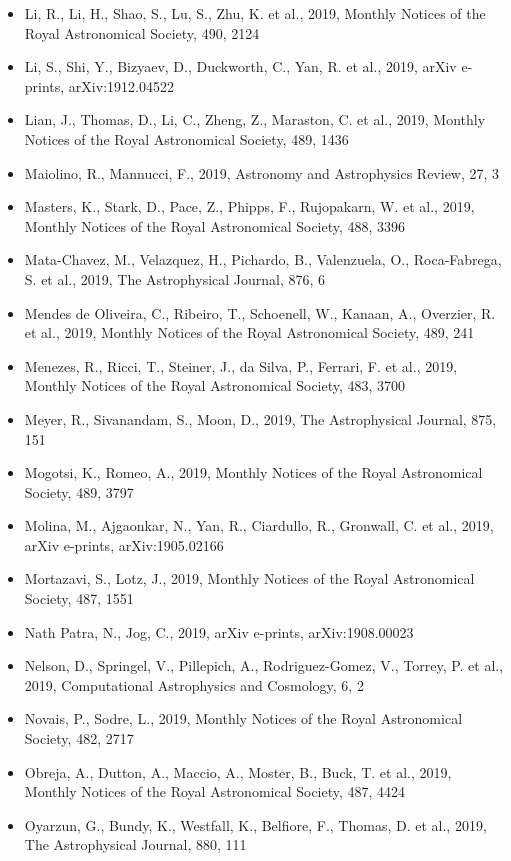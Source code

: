 \documentclass{letter}
\begin{document}
\begin{enumerate}
\begin{itemize}
\item Li, R., Li, H., Shao, S., Lu, S., Zhu, K. et al., 2019, Monthly Notices of the Royal Astronomical Society, 490, 2124
\item Li, S., Shi, Y., Bizyaev, D., Duckworth, C., Yan, R. et al., 2019, arXiv e-prints, arXiv:1912.04522
\item Lian, J., Thomas, D., Li, C., Zheng, Z., Maraston, C. et al., 2019, Monthly Notices of the Royal Astronomical Society, 489, 1436
\item Maiolino, R., Mannucci, F., 2019, Astronomy and Astrophysics Review, 27, 3
\item Masters, K., Stark, D., Pace, Z., Phipps, F., Rujopakarn, W. et al., 2019, Monthly Notices of the Royal Astronomical Society, 488, 3396
\item Mata-Chavez, M., Velazquez, H., Pichardo, B., Valenzuela, O., Roca-Fabrega, S. et al., 2019, The Astrophysical Journal, 876, 6
\item Mendes de Oliveira, C., Ribeiro, T., Schoenell, W., Kanaan, A., Overzier, R. et al., 2019, Monthly Notices of the Royal Astronomical Society, 489, 241
\item Menezes, R., Ricci, T., Steiner, J., da Silva, P., Ferrari, F. et al., 2019, Monthly Notices of the Royal Astronomical Society, 483, 3700
\item Meyer, R., Sivanandam, S., Moon, D., 2019, The Astrophysical Journal, 875, 151
\item Mogotsi, K., Romeo, A., 2019, Monthly Notices of the Royal Astronomical Society, 489, 3797
\item Molina, M., Ajgaonkar, N., Yan, R., Ciardullo, R., Gronwall, C. et al., 2019, arXiv e-prints, arXiv:1905.02166
\item Mortazavi, S., Lotz, J., 2019, Monthly Notices of the Royal Astronomical Society, 487, 1551
\item Nath Patra, N., Jog, C., 2019, arXiv e-prints, arXiv:1908.00023
\item Nelson, D., Springel, V., Pillepich, A., Rodriguez-Gomez, V., Torrey, P. et al., 2019, Computational Astrophysics and Cosmology, 6, 2
\item Novais, P., Sodre, L., 2019, Monthly Notices of the Royal Astronomical Society, 482, 2717
\item Obreja, A., Dutton, A., Maccio, A., Moster, B., Buck, T. et al., 2019, Monthly Notices of the Royal Astronomical Society, 487, 4424
\item Oyarzun, G., Bundy, K., Westfall, K., Belfiore, F., Thomas, D. et al., 2019, The Astrophysical Journal, 880, 111

\end{itemize}
\end{enumerate}
\end{document}
